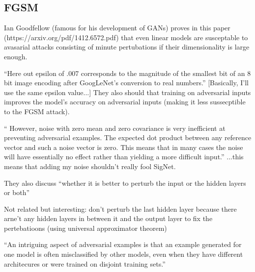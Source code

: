 \subsection{FGSM}

Ian Goodfellow (famous for his development of GANs) proves in this paper (https://arxiv.org/pdf/1412.6572.pdf) that even linear models are susceptable to avasarial attacks consisting of minute pertubations if their dimensionality is large enough.

``Here out epsilon of .007 corresponds to the magnitude of the
smallest bit of an 8 bit image encoding after GoogLeNet's conversion to real numbers.''
[Basically, I'll use the same epsilon value...]
They also should that training on adversarial inputs improves the model's accuracy on adversarial inputs (making it less sussecptible to the FGSM attack).

`` However, noise
with zero mean and zero covariance is very inefficient at preventing adversarial examples. The
expected dot product between any reference vector and such a noise vector is zero. This means that
in many cases the noise will have essentially no effect rather than yielding a more difficult input.''
...this means that adding my noise shouldn't really fool SigNet.

They also discuss ``whether it is better to perturb the input or the hidden layers or both''

Not related but interesting: don't perturb the last hidden layer because there arne't any hidden layers in between it and the output layer to fix the pertebatioons (using  universal approximator theorem)

``An intriguing aspect of adversarial examples is that an example generated for one model is often
misclassified by other models, even when they have different architecures or were trained on disjoint training sets.''
